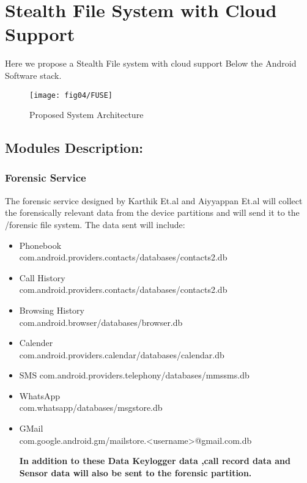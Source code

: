 %
%
\let\textcircled=\pgftextcircled
\chapter{Stealth File System with Cloud Support}
\label{chap:proposal}

Here we propose a Stealth File system with cloud support  Below the Android  Software stack.
\begin{figure}[h]
   \centering
   \texttt{[image: fig04/FUSE]}
   \caption{Proposed System Architecture}
  \end{figure}
 \section{ Modules Description:}
 
\subsection{Forensic Service}
The forensic service designed by Karthik\cite{Karthik2016} Et.al and Aiyyappan Et.al\cite{Aiyyappan2015} will collect the forensically relevant data from the device partitions and will send it to the /forensic file system. The data sent will include:
\begin{itemize}
\item Phonebook\\
  com.android.providers.contacts/databases/contacts2.db
\item Call History\\ com.android.providers.contacts/databases/contacts2.db
\item Browsing History\\ com.android.browser/databases/browser.db
\item Calender\\ com.android.providers.calendar/databases/calendar.db
\item SMS com.android.providers.telephony/databases/mmssms.db
\item WhatsApp\\ com.whatsapp/databases/msgstore.db
\item GMail\\ com.google.android.gm/mailstore.<username>@gmail.com.db

\textbf{In addition to these Data Keylogger data ,call record data and Sensor data will also be sent to the forensic partition.}
\end{itemize}
